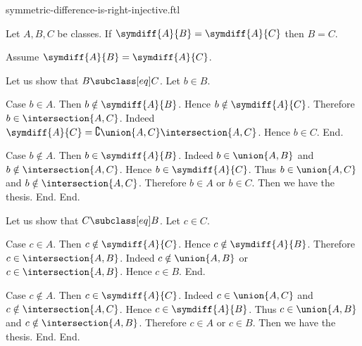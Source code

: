 \documentclass{article}
\begin{document}
\begin{smodule}[creators={Marcel Schütz}]{symmetric-difference-is-right-injective.ftl}

  \begin{fproposition*}[label=6530966763864064]
    Let $A, B, C$ be classes.
    If $\symdiff{A}{B} = \symdiff{A}{C}$ then $B = C$.
  \end{fproposition*}
  \begin{fproof}
    Assume $\symdiff{A}{B} = \symdiff{A}{C}$.

    Let us show that $B \subclass[eq] C$.
      Let $b \in B$.

      Case $b \in A$.
        Then $b \notin \symdiff{A}{B}$.
        Hence $b \notin \symdiff{A}{C}$.
        Therefore $b \in \intersection{A,C}$.
        Indeed $\symdiff{A}{C} = \complement{\union{A,C}}{\intersection{A,C}}$.
        Hence $b \in C$.
      End.

      Case $b \notin A$.
        Then $b \in \symdiff{A}{B}$.
        Indeed $b \in \union{A,B}$ and $b \notin \intersection{A,C}$.
        Hence $b \in \symdiff{A}{C}$.
        Thus $b \in \union{A,C}$ and $b \notin \intersection{A,C}$.
        Therefore $b \in A$ or $b \in C$.
        Then we have the thesis.
      End.
    End.

    Let us show that $C \subclass[eq] B$.
      Let $c \in C$.

      Case $c \in A$.
        Then $c \notin \symdiff{A}{C}$.
        Hence $c \notin \symdiff{A}{B}$.
        Therefore $c \in \intersection{A,B}$.
        Indeed $c \notin \union{A,B}$ or $c \in \intersection{A,B}$.
        Hence $c \in B$.
      End.

      Case $c \notin A$.
        Then $c \in \symdiff{A}{C}$.
        Indeed $c \in \union{A,C}$ and $c \notin \intersection{A,C}$.
        Hence $c \in \symdiff{A}{B}$.
        Thus $c \in \union{A,B}$ and $c \notin \intersection{A,B}$.
        Therefore $c \in A$ or $c \in B$.
        Then we have the thesis.
      End.
    End.
  \end{fproof}
\end{smodule}
\end{document}
